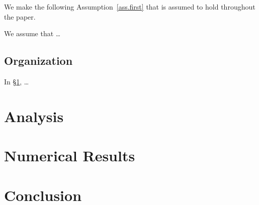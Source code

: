We make the following Assumption~\ref{ass.first} that is assumed to hold throughout the paper.

\bassumption\label{ass.first}
  We assume that \dots
\eassumption

\subsection{Organization}

In \S\ref{sec.analysis}, \dots

\section{Analysis}\label{sec.analysis}

\section{Numerical Results}\label{sec.numerical}

\section{Conclusion}\label{sec.conclusion}
